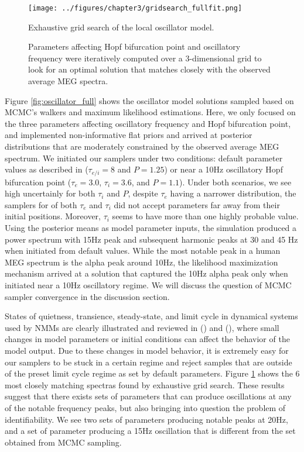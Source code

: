 \begin{figure}[htbp]
    \centering
    \texttt{[image: ../figures/chapter3/gridsearch\_fullfit.png]}
    \caption{Exhaustive grid search of the local oscillator model.}
    \caption*{Parameters affecting Hopf bifurcation point and oscillatory frequency were iteratively computed over a 3-dimensional grid to look for an optimal solution that matches closely with the observed average MEG spectra.}
    \label{fig:grid_search}
\end{figure}

Figure \ref{fig:oscillator_full} shows the oscillator model solutions sampled based on MCMC's walkers and maximum likelihood estimations. Here, we only focused on the three parameters affecting oscillatory frequency and Hopf bifurcation point, and implemented non-informative flat priors and arrived at posterior distributions that are moderately constrained by the observed average MEG spectrum. We initiated our samplers under two conditions: default parameter values as described in \cite{muldoon_stimulation-based_2016} ($\tau_{e/i} = 8$ and $P=1.25$) or near a 10Hz oscillatory Hopf bifurcation point ($\tau_e = 3.0$, $\tau_i = 3.6$, and $P=1.1$). Under both scenarios, we see high uncertainly for both $\tau_i$ and $P$, despite $\tau_e$ having a narrower distribution, the samplers for of both $\tau_e$ and $\tau_i$ did not accept parameters far away from their initial positions. Moreover, $\tau_i$ seems to have more than one highly probable value. Using the posterior means as model parameter inputs, the simulation produced a power spectrum with 15Hz peak and subsequent harmonic peaks at 30 and 45 Hz when initiated from default values. While the most notable peak in a human MEG spectrum is the alpha peak around 10Hz, the likelihood maximization mechanism arrived at a solution that captured the 10Hz alpha peak only when initiated near a 10Hz oscillatory regime. We will discuss the question of MCMC sampler convergence in the discussion section.

States of quietness, transience, steady-state, and limit cycle in dynamical systems used by NMMs are clearly illustrated and reviewed in (\cite{breakspear_dynamic_2017}) and (\cite{sanz-leon_mathematical_2015}), where small changes in model parameters or initial conditions can affect the behavior of the model output. Due to these changes in model behavior, it is extremely easy for our samplers to be stuck in a certain regime and reject samples that are outside of the preset limit cycle regime as set by default parameters. Figure \ref{fig:grid_search} shows the 6 most closely matching spectras found by exhaustive grid search. These results suggest that there exists sets of parameters that can produce oscillations at any of the notable frequency peaks, but also bringing into question the problem of identifiability. We see two sets of parameters producing notable peaks at 20Hz, and a set of parameter producing a 15Hz oscillation that is different from the set obtained from MCMC sampling. 

